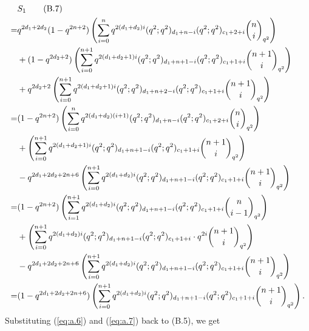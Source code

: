 \documentclass[table,a4paper,reqno]{amsart}
\numberwithin{equation}{section}
\theoremstyle{definition}
\begin{document}
\begin{align}\label{eq:a.7}\stepcounter{equation}
        &S_1\tag{B.7}\\
        =&q^{2d_1+2d_2}(1-q^{2n+2})\left(\sum_{i=0}^{n}q^{2(d_1+d_2)i}(q^2;q^2)_{d_1+n-i}(q^2;q^2)_{c_1+2+i}{n\choose i}_{q^2}\right)\notag\\
        &+(1-q^{2d_2+2})\left(\sum_{i=0}^{n+1}q^{2(d_1+d_2+1)i}(q^2;q^2)_{d_1+n+1-i}(q^2;q^2)_{c_1+1+i}{n+1\choose i}_{q^2}\right)\notag\\
        &+q^{2d_2+2}\left(\sum_{i=0}^{n+1}q^{2(d_1+d_2+1)i}(q^2;q^2)_{d_1+n+2-i}(q^2;q^2)_{c_1+1+i}{n+1\choose i}_{q^2}\right)\notag\\
        =&(1-q^{2n+2})\left(\sum_{i=0}^{n}q^{2(d_1+d_2)(i+1)}(q^2;q^2)_{d_1+n-i}(q^2;q^2)_{c_1+2+i}{n\choose i}_{q^2}\right)\notag\\
        &+\left(\sum_{i=0}^{n+1}q^{2(d_1+d_2+1)i}(q^2;q^2)_{d_1+n+1-i}(q^2;q^2)_{c_1+1+i}{n+1\choose i}_{q^2}\right)\notag\\
        &-q^{2d_1+2d_2+2n+6}\left(\sum_{i=0}^{n+1}q^{2(d_1+d_2)i}(q^2;q^2)_{d_1+n+1-i}(q^2;q^2)_{c_1+1+i}{n+1\choose i}_{q^2}\right)\notag\\
        =&(1-q^{2n+2})\left(\sum_{i=1}^{n+1}q^{2(d_1+d_2)i}(q^2;q^2)_{d_1+n+1-i}(q^2;q^2)_{c_1+1+i}{n\choose i-1}_{q^2}\right)\notag\\
        &+\left(\sum_{i=0}^{n+1}q^{2(d_1+d_2)i}(q^2;q^2)_{d_1+n+1-i}(q^2;q^2)_{c_1+1+i}\cdot q^{2i}{n+1\choose i}_{q^2}\right)\notag\\
        &-q^{2d_1+2d_2+2n+6}\left(\sum_{i=0}^{n+1}q^{2(d_1+d_2)i}(q^2;q^2)_{d_1+n+1-i}(q^2;q^2)_{c_1+1+i}{n+1\choose i}_{q^2}\right)\notag\\
        =&(1-q^{2d_1+2d_2+2n+6})\left(\sum_{i=0}^{n+1}q^{2(d_1+d_2)i}(q^2;q^2)_{d_1+n+1-i}(q^2;q^2)_{c_1+1+i}{n+1\choose i}_{q^2}\right).\notag
\end{align}
Substituting (\ref{eq:a.6}) and (\ref{eq:a.7}) back to (B.5), we get
\end{document}
